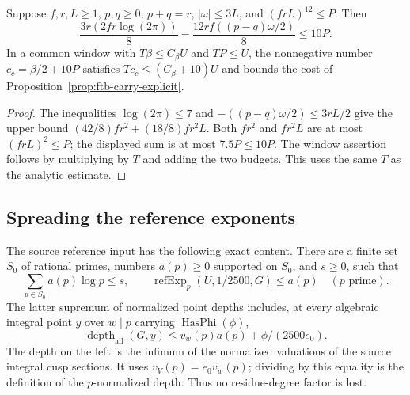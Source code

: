 \begin{srlemma}\label{lem:ftb-carry-cost-numerical}
Suppose \(f,r,L\geq1\), \(p,q\geq0\), \(p+q=r\),
\(|\omega|\leq3L\), and \((frL)^{12}\leq P\).
Then
\[
 \frac{3r(2fr\log(2\pi))}{8}
 -\frac{12rf((p-q)\omega/2)}8\leq10P.
\]
In a common window with \(T\beta\leq C_\beta U\) and \(TP\leq U\),
the nonnegative number \(c_c=\beta/2+10P\) satisfies
\(Tc_c\leq(C_\beta+10)U\) and bounds the cost of
Proposition~\ref{prop:ftb-carry-explicit}.
\end{srlemma}
\begin{proof}
The inequalities \(\log(2\pi)\leq7\) and
\(-((p-q)\omega/2)\leq3rL/2\) give the upper bound
\((42/8)fr^2+(18/8)fr^2L\).
Both \(fr^2\) and \(fr^2L\) are at most \((frL)^2\leq P\);
the displayed sum is at most \(7.5P\leq10P\).
The window assertion follows by multiplying by \(T\) and adding
the two budgets.  This uses the same \(T\) as the analytic estimate.
\end{proof}

\subsection{Spreading the reference exponents}
The source reference input has the following exact content.
There are a finite set \(S_0\) of rational primes, numbers
\(a(p)\geq0\) supported on \(S_0\), and \(s\geq0\), such that
\[
 \sum_{p\in S_0}a(p)\log p\leq s,\qquad
 \operatorname{refExp}_p(U,1/2500,G)\leq a(p)
       \quad(p\text{ prime}).                      \tag{C13}\label{eq:ftb-ref-budget}
\]
The latter supremum of normalized point depths includes, at every
algebraic integral point \(y\) over \(w\mid p\) carrying
\(\operatorname{HasPhi}(\phi)\),
\[
 \operatorname{depth}_{\mathrm{all}}(G,y)
       \leq v_w(p)a(p)+\phi/(2500e_0).              \tag{C14}\label{eq:ftb-ref-point}
\]
The depth on the left is the infimum of the normalized valuations of
the source integral cusp sections.  It uses
\(v_V(p)=e_0v_w(p)\); dividing by this equality is the definition
of the \(p\)-normalized depth.  Thus no residue-degree factor is lost.

